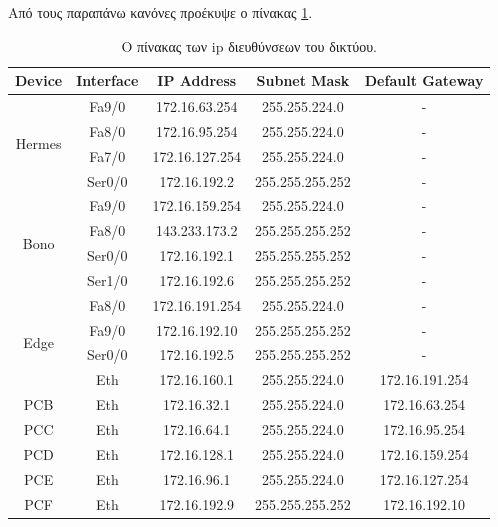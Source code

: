 \documentclass{assignment}
\begin{document}
Από τους παραπάνω κανόνες προέκυψε ο πίνακας \ref{table:VLSM_ip}.

\begin{table}
\begin{minipage}{\textwidth} 
\begin{center}
  \begin{tabular}{|c|c|c|c|c|}
    \hline
    Device & Interface & IP Address & Subnet Mask & Default Gateway \\ \hline
    \multirow{4}{*}{Hermes} &  Fa9/0 & 172.16.63.254 & 255.255.224.0 & - \\ \cline{2-5}
                            &  Fa8/0 & 172.16.95.254 & 255.255.224.0 & - \\ \cline{2-5}
                            &  Fa7/0 & 172.16.127.254 & 255.255.224.0 & - \\ \cline{2-5}
                            &  Ser0/0 & 172.16.192.2 & 255.255.255.252 & - \\ \hline

    \multirow{4}{*}{Bono}   &  Fa9/0 & 172.16.159.254 & 255.255.224.0 & - \\ \cline{2-5}
                            &  Fa8/0 & 143.233.173.2 & 255.255.255.252 & - \\ \cline{2-5}
                            &  Ser0/0 & 172.16.192.1 & 255.255.255.252 & - \\ \cline{2-5}
                            &  Ser1/0 & 172.16.192.6 & 255.255.255.252 & - \\ \hline

    \multirow{4}{*}{Edge}   &  Fa8/0 & 172.16.191.254 & 255.255.224.0 & - \\ \cline{2-5}
                            &  Fa9/0 & 172.16.192.10 & 255.255.255.252 & - \\ \cline{2-5}
                            &  Ser0/0 & 172.16.192.5 & 255.255.255.252 & - \\  \hline

    PCA & Eth & 172.16.160.1 & 255.255.224.0 & 172.16.191.254 \\ \hline
    PCB & Eth & 172.16.32.1 & 255.255.224.0 & 172.16.63.254 \\ \hline
    PCC & Eth & 172.16.64.1 & 255.255.224.0 & 172.16.95.254 \\ \hline
    PCD & Eth & 172.16.128.1 & 255.255.224.0 & 172.16.159.254 \\ \hline
    PCE & Eth & 172.16.96.1 & 255.255.224.0 & 172.16.127.254 \\ \hline
    PCF & Eth & 172.16.192.9 & 255.255.255.252 & 172.16.192.10 \\ \hline
  \end{tabular}
\caption{Ο πίνακας των ip διευθύνσεων του δικτύου.}
\label{table:VLSM_ip}
\end{center}
\end{minipage}
\end{table}
\end{document}
